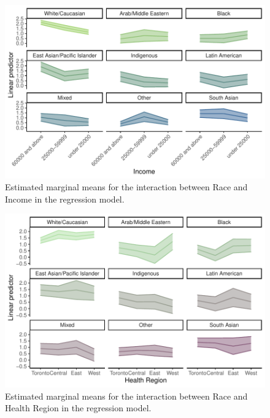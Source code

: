 \documentclass[
  letterpaper,
  DIV=11,
  numbers=noendperiod]{scrartcl}
\begin{document}
\begin{figure}

{\centering \includegraphics{appendix_files/figure-pdf/interaction-race-income-1.pdf}

}

\caption{Estimated marginal means for the interaction between Race and
Income in the regression model.}

\end{figure}

\begin{figure}

{\centering \includegraphics{appendix_files/figure-pdf/interaction-race-hr-1.pdf}

}

\caption{Estimated marginal means for the interaction between Race and
Health Region in the regression model.}

\end{figure}
\end{document}
